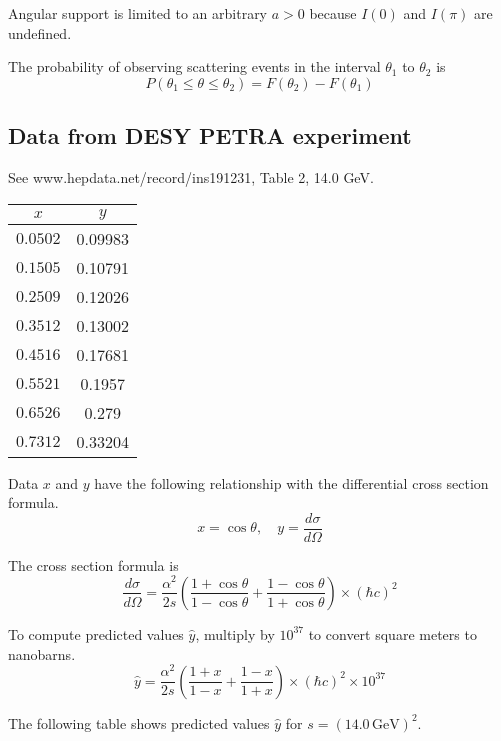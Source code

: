\documentclass[12pt]{article}
\begin{document}
Angular support is limited to an arbitrary $a>0$
because $I(0)$ and $I(\pi)$ are undefined.

\bigskip
The probability of observing scattering events in the interval
$\theta_1$ to $\theta_2$ is
\begin{equation*}
P(\theta_1\le\theta\le\theta_2)=F(\theta_2)-F(\theta_1)
\end{equation*}

\subsection*{Data from DESY PETRA experiment}
See www.hepdata.net/record/ins191231, Table 2, 14.0 GeV.

\begin{center}
\begin{tabular}{|c|c|}
\hline
$x$ & $y$\\
\hline
$0.0502$ & 0.09983\\
$0.1505$ & 0.10791\\
$0.2509$ & 0.12026\\
$0.3512$ & 0.13002\\
$0.4516$ & 0.17681\\
$0.5521$ & 0.1957\phantom{0}\\
$0.6526$ & 0.279\phantom{00}\\
$0.7312$ & 0.33204\\
\hline
\end{tabular}
\end{center}

Data $x$ and $y$ have the following relationship
with the differential cross section formula.
\begin{equation*}
x=\cos\theta,
\quad
y=\frac{d\sigma}{d\Omega}
\end{equation*}

The cross section formula is
\begin{equation*}
\frac{d\sigma}{d\Omega}
=
\frac{\alpha^2}{2s}
\left(
\frac{1+\cos\theta}{1-\cos\theta}+
\frac{1-\cos\theta}{1+\cos\theta}
\right)\times(\hbar c)^2
\end{equation*}

To compute predicted values $\hat{y}$,
multiply by $10^{37}$ to convert square meters to nanobarns.
\begin{equation*}
\hat{y}
=
\frac{\alpha^2}{2s}
\left(
\frac{1+x}{1-x}+
\frac{1-x}{1+x}
\right)
\times(\hbar c)^2
\times10^{37}
\end{equation*}

The following table shows predicted values $\hat{y}$ for $s=(14.0\,\text{GeV})^2$.
\end{document}
